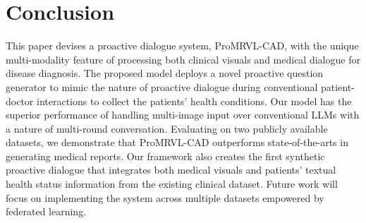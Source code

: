 \section{Conclusion}
This paper devises a proactive dialogue system, ProMRVL-CAD, with the unique multi-modality feature of processing both clinical visuals and medical dialogue for disease diagnosis. The proposed model deploys a novel proactive question generator to mimic the nature of proactive dialogue during conventional patient-doctor interactions to collect the patients' health conditions. Our model has the superior performance of handling multi-image input over conventional LLMs with a nature of multi-round conversation. Evaluating on two publicly available datasets, we demonstrate that ProMRVL-CAD outperforms state-of-the-arts in generating medical reports. Our framework also creates the first synthetic proactive dialogue that integrates both medical visuals and patients' textual health status information from the existing clinical dataset. Future work will focus on implementing the system across multiple datasets empowered by federated learning. 